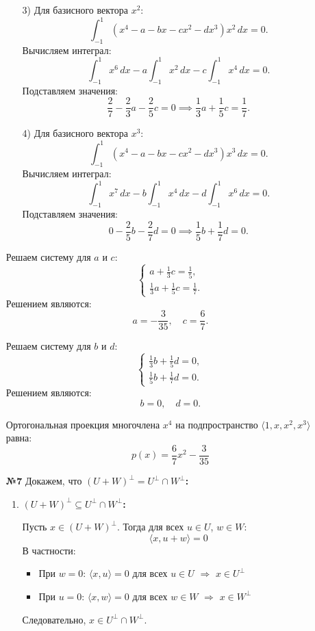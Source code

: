 \documentclass[a4paper]{article}
\begin{document}
\begin{enumerate}
\begin{enumerate}
        \item[3)]Для базисного вектора \(x^2\):
        \[
        \int_{-1}^{1} (x^4 - a - bx - cx^2 - dx^3)x^2 \, dx = 0.
        \]
        Вычисляем интеграл:
        \[
        \int_{-1}^{1} x^6 \, dx - a \int_{-1}^{1} x^2 \, dx - c \int_{-1}^{1} x^4 \, dx = 0.
        \]
        Подставляем значения:
        \[
        \frac{2}{7} - \frac{2}{3}a - \frac{2}{5}c = 0 \implies \frac{1}{3}a + \frac{1}{5}c = \frac{1}{7}.
        \]

        \item[4)]Для базисного вектора \(x^3\):
        \[
        \int_{-1}^{1} (x^4 - a - bx - cx^2 - dx^3)x^3 \, dx = 0.
        \]
        Вычисляем интеграл:
        \[
        \int_{-1}^{1} x^7 \, dx - b \int_{-1}^{1} x^4 \, dx - d \int_{-1}^{1} x^6 \, dx = 0.
        \]
        Подставляем значения:
        \[
        0 - \frac{2}{5}b - \frac{2}{7}d = 0 \implies \frac{1}{5}b + \frac{1}{7}d = 0.
        \]
    \end{enumerate}

    Решаем систему для \(a\) и \(c\):
    \[
    \begin{cases}
    a + \frac{1}{3}c = \frac{1}{5}, \\
    \frac{1}{3}a + \frac{1}{5}c = \frac{1}{7}.
    \end{cases}
    \]
    Решением являются:
    \[
    a = -\frac{3}{35}, \quad c = \frac{6}{7}.
    \]

    Решаем систему для \(b\) и \(d\):
    \[
    \begin{cases}
    \frac{1}{3}b + \frac{1}{5}d = 0, \\
    \frac{1}{5}b + \frac{1}{7}d = 0.
    \end{cases}
    \]
    Решением являются:
    \[
    b = 0, \quad d = 0.
    \]

    Ортогональная проекция многочлена \( x^4 \) на подпространство \(\langle 1, x, x^2, x^3 \rangle\) равна:
    \[
    p(x) = \dfrac{6}{7}x^2 - \dfrac{3}{35}
    \]

    \item[\textbf{№7}]Докажем, что $(U + W)^\perp = U^\perp \cap W^\perp$\textbf{:}
    
    \begin{enumerate}
        \item $(U + W)^\perp \subseteq U^\perp \cap W^\perp$\textbf{:}
        
        Пусть $x \in (U + W)^\perp$. Тогда для всех $u \in U$, $w \in W$:
        \[
        \langle x, u + w \rangle = 0
        \]
        В частности:
        \begin{itemize}
            \item При $w = 0$: $\langle x, u \rangle = 0$ для всех $u \in U$ $\Rightarrow$ $x \in U^\perp$
            \item При $u = 0$: $\langle x, w \rangle = 0$ для всех $w \in W$ $\Rightarrow$ $x \in W^\perp$
        \end{itemize}
        Следовательно, $x \in U^\perp \cap W^\perp$.


\end{enumerate}
\end{enumerate}
\end{document}
